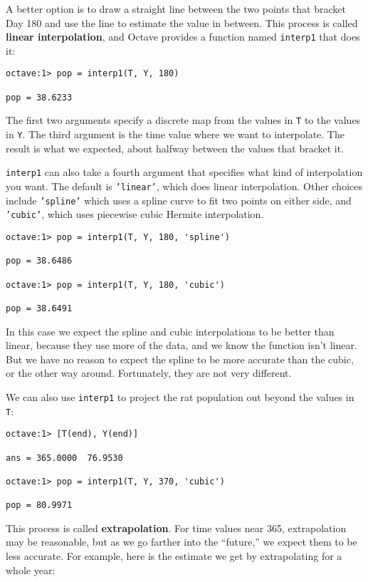A better option is to draw a straight line between the two points that
bracket Day 180 and use the line to estimate the value in between.
This process is called {\bf linear interpolation}, and Octave provides
a function named {\tt interp1} that does it:

\begin{verbatim}
octave:1> pop = interp1(T, Y, 180)

pop = 38.6233
\end{verbatim}

The first two arguments specify a discrete map from the values in
{\tt T} to the values in {\tt Y}. The third argument is the
time value where we want to interpolate. The result is what
we expected, about halfway between the values that bracket it.

{\tt interp1} can also take a fourth argument that specifies what
kind of interpolation you want. The default is {\tt 'linear'}, which
does linear interpolation. Other choices include {\tt 'spline'}
which uses a spline curve to fit two points on either side,
and {\tt 'cubic'}, which uses piecewise cubic Hermite interpolation.

\begin{verbatim}
octave:1> pop = interp1(T, Y, 180, 'spline')

pop = 38.6486

octave:1> pop = interp1(T, Y, 180, 'cubic')

pop = 38.6491
\end{verbatim}

In this case we expect the spline and cubic interpolations to be
better than linear, because they use more of the data, and we know the
function isn't linear. But we have no reason to expect the spline to
be more accurate than the cubic, or the other way around.
Fortunately, they are not very different.

We can also use {\tt interp1} to project the rat population out
beyond the values in {\tt T}:

\begin{verbatim}
octave:1> [T(end), Y(end)]

ans = 365.0000  76.9530

octave:1> pop = interp1(T, Y, 370, 'cubic')

pop = 80.9971
\end{verbatim}

This process is called {\bf extrapolation}. For time values near
365, extrapolation may be reasonable, but as we go farther into
the ``future,'' we expect them to be less accurate.
For example, here is the estimate we get by extrapolating for a whole
year:

